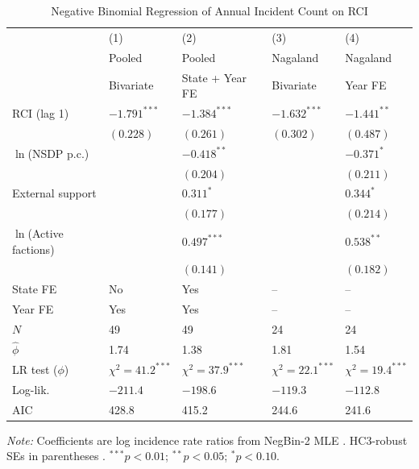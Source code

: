 \documentclass[12pt,a4paper]{article}
\begin{document}
\begin{table}[H]
\centering
\caption{Negative Binomial Regression of Annual Incident Count on RCI}
\label{tab:nb_results}
\begin{threeparttable}
\small
\setlength{\tabcolsep}{6pt}
\renewcommand{\arraystretch}{1.12}
\begin{tabular}{lC{2.3cm}C{2.3cm}C{2.3cm}C{2.3cm}}
\toprule
 & (1) & (2) & (3) & (4)\\
 & Pooled & Pooled & Nagaland & Nagaland\\
 & Bivariate & State + Year FE & Bivariate & Year FE\\
\midrule
RCI (lag 1)
  & $-1.791^{***}$ & $-1.384^{***}$
  & $-1.632^{***}$ & $-1.441^{**}$\\
  & $(0.228)$      & $(0.261)$
  & $(0.302)$      & $(0.487)$\\[4pt]
$\ln$(NSDP p.c.)
  &                & $-0.418^{**}$
  &                & $-0.371^{*}$\\
  &                & $(0.204)$
  &                & $(0.211)$\\[4pt]
External support
  &                & $0.311^{*}$
  &                & $0.344^{*}$\\
  &                & $(0.177)$
  &                & $(0.214)$\\[4pt]
$\ln$(Active factions)
  &                & $0.497^{***}$
  &                & $0.538^{**}$\\
  &                & $(0.141)$
  &                & $(0.182)$\\
\midrule
State FE      & No  & Yes & --  & --\\
Year FE       & Yes & Yes & -- & --\\
$N$           &  49 &  49 &  24 &  24\\
$\hat\phi$    & 1.74 & 1.38 & 1.81 & 1.54\\
LR test ($\phi$) & $\chi^2=41.2^{***}$ & $\chi^2=37.9^{***}$ & $\chi^2=22.1^{***}$ & $\chi^2=19.4^{***}$\\
Log-lik.      & $-211.4$ & $-198.6$ & $-119.3$ & $-112.8$\\
AIC           &  428.8 &  415.2 &  244.6 &  241.6\\
\bottomrule
\end{tabular}
\begin{tablenotes}\small
\item \textit{Note:} Coefficients are log incidence rate ratios from NegBin-2 MLE \citep{cameron1998}. HC3-robust SEs in parentheses \citep{mackinnon1985}. $^{***}p{<}0.01$; $^{**}p{<}0.05$; $^{*}p{<}0.10$.
\end{tablenotes}
\end{threeparttable}
\end{table}
\end{document}
